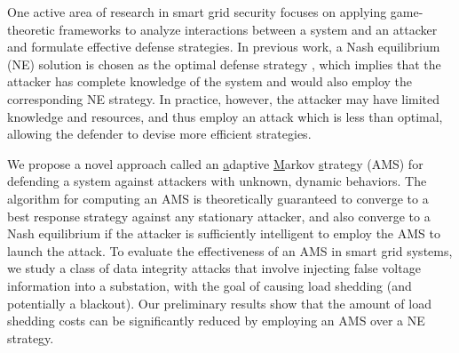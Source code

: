 One active area of research in smart grid security focuses on applying
game-theoretic frameworks to analyze interactions between a system and
an attacker and formulate effective defense strategies. In previous work,
a Nash equilibrium (NE) solution is chosen as the optimal defense
strategy \cite{law2012security,ma2013markov}, which implies that the
attacker has complete knowledge of the system and would also employ
the corresponding NE strategy. In practice, however, the attacker may
have limited knowledge and resources, and thus employ an attack which
is less than optimal, allowing the defender to devise more efficient
strategies.

We propose a novel approach called an \underline{a}daptive
\underline{M}arkov \underline{s}trategy (AMS) for defending a system
against attackers with unknown, dynamic behaviors. The algorithm for
computing an AMS is theoretically guaranteed to converge to a best
response strategy against any stationary attacker, and also converge
to a Nash equilibrium if the attacker is sufficiently intelligent to
employ the AMS to launch the attack. To evaluate the effectiveness of
an AMS in smart grid systems, we study a class of data integrity
attacks that involve injecting false voltage information into a
substation, with the goal of causing load shedding (and potentially a
blackout). Our preliminary results show that the amount of load
shedding costs can be significantly reduced by employing an AMS over
a NE strategy.
